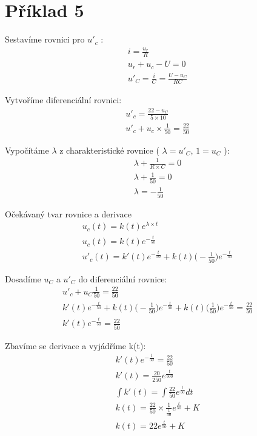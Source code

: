 \section{Příklad 5}

Sestavíme rovnici pro $u'_c$ :
\begin{gather*}
    i = \frac{u_r}{R} \\
    u_r + u_c - U = 0 \\
    u'_C = \frac{i}{C} = \frac{U - u_C}{RC}
\end{gather*}

Vytvoříme diferenciální rovnici:
\begin{gather*}
    u'_c = \frac{22 - u_C}{5 \times 10} \\
    u'_c + u_c \times \frac{1}{50} = \frac{22}{50}
\end{gather*}

Vypočítáme $\lambda$ z charakteristické rovnice ( $\lambda = u'_C$, $1 = u_C$ ):
\begin{gather*}
    \lambda + \frac{1}{R \times C} = 0 \\
    \lambda + \frac{1}{50} = 0 \\
    \lambda = - \frac{1}{50}
\end{gather*}

Očekávaný tvar rovnice a derivace
\begin{gather*}
    u_c(t) = k(t)e^{\lambda \times t} \\
    u_c(t) = k(t)e^{-\frac{t}{50}} \\
    u'_c(t) = k'(t)e^{-\frac{t}{50}} + k(t) \Big(-\frac{1}{50}\Big) e^{-\frac{t}{50}}
\end{gather*}

Dosadíme $u_C$ a $u'_C$ do diferenciální rovnice:
\begin{gather*}
    u'_c + u_C \frac{1}{50} = \frac{22}{50} \\
    k'(t)e^{-\frac{t}{50}} + k(t) \Big(-\frac{1}{50}\Big)e^{-\frac{t}{50}}
    + k(t) \Big(\frac{1}{50}\Big)e^{-\frac{t}{50}} = \frac{22}{50} \\
    k'(t)e^{-\frac{t}{50}} = \frac{22}{50}
\end{gather*}

Zbavíme se derivace a vyjádříme k(t):
\begin{gather*}
    k'(t)e^{-\frac{t}{50}} = \frac{22}{50} \\
    k'(t) = \frac{20}{250}e^{\frac{t}{500}} \\
    \int k'(t) = \int \frac{22}{50}e^{\frac{t}{50}}dt \\
    k(t) = \frac{22}{50} \times \frac{1}{\frac{1}{50}} e^{\frac{t}{50}} + K \\
    k(t) = 22e^{\frac{t}{50}} + K
\end{gather*}

